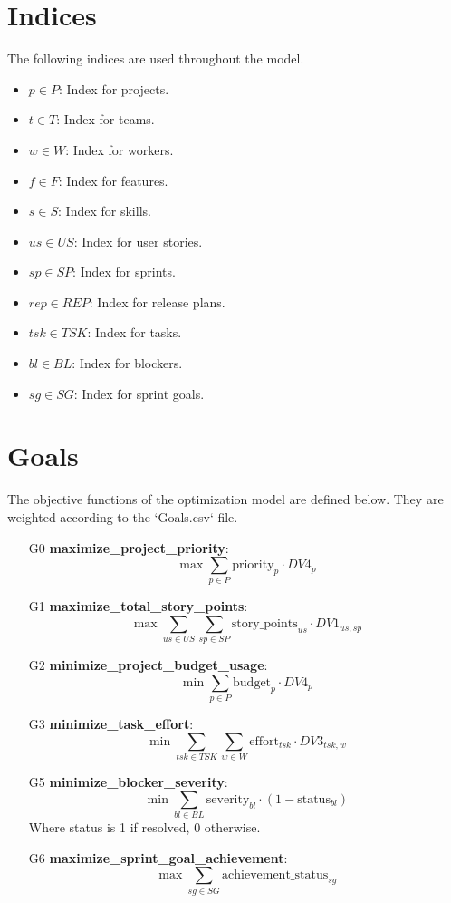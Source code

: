 \documentclass{article}
\begin{document}
\section{Indices}
The following indices are used throughout the model.
\begin{itemize}
    \item $p \in P$: Index for projects.
    \item $t \in T$: Index for teams.
    \item $w \in W$: Index for workers.
    \item $f \in F$: Index for features.
    \item $s \in S$: Index for skills.
    \item $us \in US$: Index for user stories.
    \item $sp \in SP$: Index for sprints.
    \item $rep \in REP$: Index for release plans.
    \item $tsk \in TSK$: Index for tasks.
    \item $bl \in BL$: Index for blockers.
    \item $sg \in SG$: Index for sprint goals.
\end{itemize}

\section{Goals}
The objective functions of the optimization model are defined below. They are weighted according to the `Goals.csv` file.
\begin{itemize}
    \item [G0] \textbf{maximize\_project\_priority}:
    $$ \max \sum_{p \in P} \text{priority}_p \cdot DV4_p $$
    \item [G1] \textbf{maximize\_total\_story\_points}:
    $$ \max \sum_{us \in US} \sum_{sp \in SP} \text{story\_points}_{us} \cdot DV1_{us,sp} $$
    \item [G2] \textbf{minimize\_project\_budget\_usage}:
    $$ \min \sum_{p \in P} \text{budget}_p \cdot DV4_p $$
    \item [G3] \textbf{minimize\_task\_effort}:
    $$ \min \sum_{tsk \in TSK} \sum_{w \in W} \text{effort}_{tsk} \cdot DV3_{tsk,w} $$
    \item [G5] \textbf{minimize\_blocker\_severity}:
    $$ \min \sum_{bl \in BL} \text{severity}_{bl} \cdot (1 - \text{status}_{bl}) $$
    Where status is 1 if resolved, 0 otherwise.
    \item [G6] \textbf{maximize\_sprint\_goal\_achievement}:
    $$ \max \sum_{sg \in SG} \text{achievement\_status}_{sg} $$
\end{itemize}
\end{document}
